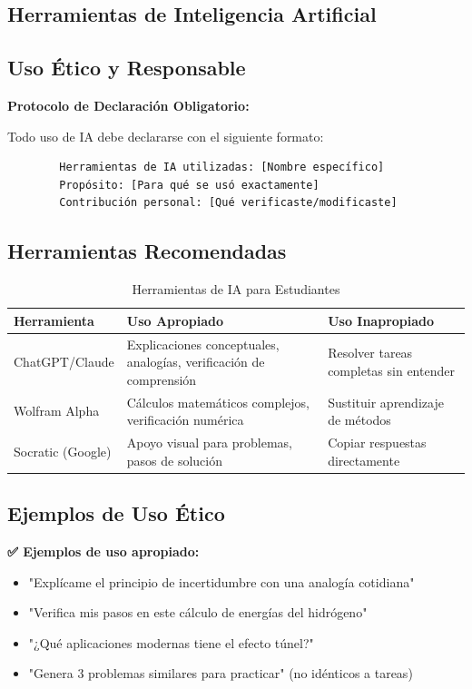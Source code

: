 \begin{tecnologiabox}
\begin{tecnologiabox}
\begin{tecnologiabox}
\section{Herramientas de Inteligencia Artificial}

\subsection{Uso Ético y Responsable}

\begin{notabox}
	\textbf{Protocolo de Declaración Obligatorio:}
	
	Todo uso de IA debe declararse con el siguiente formato:
	\begin{verbatim}
		Herramientas de IA utilizadas: [Nombre específico]
		Propósito: [Para qué se usó exactamente]
		Contribución personal: [Qué verificaste/modificaste]
	\end{verbatim}
\end{notabox}

\subsection{Herramientas Recomendadas}

\begin{table}[h]
	\centering
	\caption{Herramientas de IA para Estudiantes}
	\begin{tabular}{|L{3cm}|L{4cm}|L{5cm}|}
		\hline
		\textbf{Herramienta} & \textbf{Uso Apropiado} & \textbf{Uso Inapropiado} \\
		\hline
		ChatGPT/Claude & Explicaciones conceptuales, analogías, verificación de comprensión & Resolver tareas completas sin entender \\
		\hline
		Wolfram Alpha & Cálculos matemáticos complejos, verificación numérica & Sustituir aprendizaje de métodos \\
		\hline
		Socratic (Google) & Apoyo visual para problemas, pasos de solución & Copiar respuestas directamente \\
		\hline
	\end{tabular}
\end{table}

\subsection{Ejemplos de Uso Ético}

\begin{consejobox}
	\textbf{✅ Ejemplos de uso apropiado:}
	\begin{itemize}
		\item "Explícame el principio de incertidumbre con una analogía cotidiana"
		\item "Verifica mis pasos en este cálculo de energías del hidrógeno"
		\item "¿Qué aplicaciones modernas tiene el efecto túnel?"
		\item "Genera 3 problemas similares para practicar" (no idénticos a tareas)
	\end{itemize}
	

\end{consejobox}
\end{tecnologiabox}
\end{tecnologiabox}
\end{tecnologiabox}
